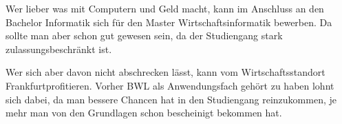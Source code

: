 Wer lieber was mit Computern und Geld macht, kann im Anschluss an den Bachelor Informatik sich f\"ur den Master Wirtschaftsinformatik bewerben. Da sollte man aber schon gut gewesen sein, da der Studiengang stark zulassungsbeschr\"ankt ist.

Wer sich aber davon nicht abschrecken l\"asst, kann vom Wirtschaftsstandort Frankfurt\texttrademark{ }profitieren\texttrademark.
Vorher BWL als Anwendungsfach geh\"ort zu haben lohnt sich dabei, da man bessere Chancen hat in den Studiengang reinzukommen,
je mehr man von den Grundlagen schon bescheinigt bekommen hat.
